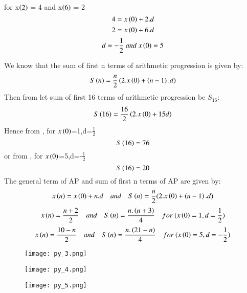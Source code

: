 \documentclass[beamer]{IEEEtran}
\theoremstyle{remark}
\begin{document}
for x$\left(2\right)$ = 4 and x$\left(6\right)$ = 2
$$4 = x\left(0\right)+2.d$$
$$2 = x\left(0\right)+6.d$$
$$d=-\frac{1}{2}\ and\ x\brak{0}=5$$

We know that the sum of first n terms of arithmetic progression is given by:
\begin{equation}
\label{q9}
S\left(n\right)= \frac{n}{2}\left(2.x\left(0\right)+\left(n-1\right).d\right)
\end{equation}
Then from \brak{\ref{q9}} let sum of first 16 terms of arithmetic progression be $S_{16}$:
\begin{equation}
\label{q10}
S\left(16\right)= \frac{16}{2}\left(2.x\left(0\right)+15d\right)
\end{equation}
Hence from \brak{\ref{q10}},
for $x\left(0\right)$=1,d=$\frac{1}{2}$
$$S\left(16\right)=76$$
or from \brak{\ref{q10}},
for $x\left(0\right)$=5,d=-$\frac{1}{2}$
$$S\left(16\right)=20$$
The general term of AP  and sum of first n terms of AP  are given by:
$$x\left(n\right)=x\left(0\right)+n.d\quad and\quad S\left(n\right)=\frac{n}{2}(2.x\left(0\right)+\left(n-1\right).d)$$
$$x\brak{n}=\frac{n+2}{2}\quad and\quad S\brak{n}=\frac{n.\brak{n+3}}{4}\quad for\ (x\brak{0}=1,d=\frac{1}{2})$$
$$x\brak{n}=\frac{10-n}{2}\quad and\quad S\brak{n}=\frac{n.\brak{21-n}}{4}\quad for\ (x\brak{0}=5,d=-\frac{1}{2})$$

\begin{figure}[h]
    \centering
    \texttt{[image: py\_3.png]}
    \label{fig:enter-label}
\end{figure}

\begin{figure}[h]
    \centering
    \texttt{[image: py\_4.png]}
    \label{fig:enter-label}
\end{figure}

\begin{figure}[h]
    \centering
    \texttt{[image: py\_5.png]}
    \label{fig:enter-label}
\end{figure}
\end{document}
